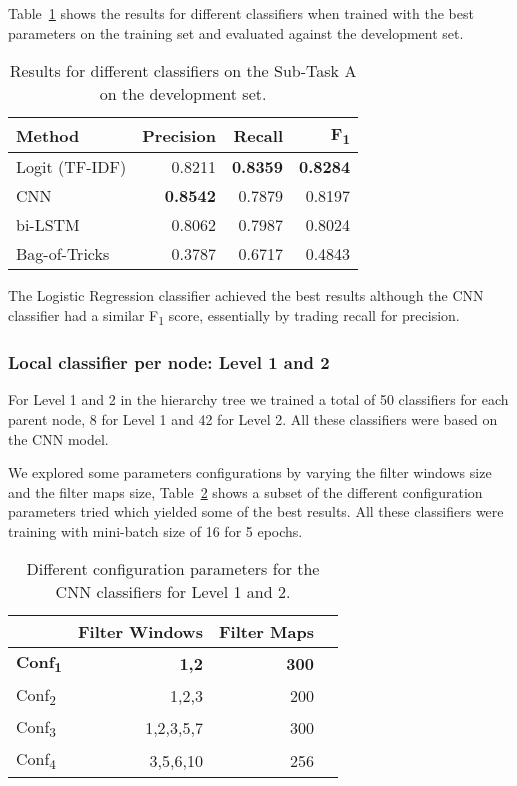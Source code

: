 \documentclass[11pt,a4paper]{article}
\begin{document}
Table~\ref{subtask_a_devset-results} shows the results for different classifiers
when trained with the best parameters on the training set and evaluated against
the development set.

\begin{table}[!h]
\begin{center}
\begin{tabular}{|l|r|r|r|}
\hline\centering\textbf{Method}  & \textbf{Precision} &  \textbf{Recall} &  \textbf{F\textsubscript{1}}\\
\hline
 Logit (TF-IDF) & 0.8211 & \textbf{0.8359} & \textbf{0.8284} \\
 CNN            & \textbf{0.8542} & 0.7879 & 0.8197 \\
 bi-LSTM        & 0.8062 & 0.7987 & 0.8024 \\
 Bag-of-Tricks  & 0.3787 & 0.6717 & 0.4843 \\
\hline
\end{tabular}
\end{center}
\caption{\label{subtask_a_devset-results} Results for different classifiers on
         the Sub-Task A on the development set.}
\end{table}

The Logistic Regression classifier achieved the best results
although the CNN classifier had a similar F\textsubscript{1} score, essentially
by trading recall for precision.


\subsubsection{Local classifier per node: Level 1 and 2}

For Level 1 and 2 in the hierarchy tree we trained a total of 50 classifiers
for each parent node, 8 for Level 1 and 42 for Level 2. All these classifiers
were based on the CNN model.

We explored some parameters configurations by varying the filter windows size and
the filter maps size, Table~\ref{subtask_b_parameters_local} shows a subset of the different
configuration parameters tried which yielded some of the best results. All these
classifiers were training with mini-batch size of 16 for 5 epochs.

\begin{table}[!h]
\begin{center}
\begin{tabular}{|l|r|r|r|}
\hline\centering\textbf{}  & \textbf{Filter Windows} &  \textbf{Filter Maps} \\
\hline
\textbf{Conf\textsubscript{1}} & \textbf{1,2}       & \textbf{300} \\
Conf\textsubscript{2} & 1,2,3     & 200 \\
Conf\textsubscript{3} & 1,2,3,5,7 & 300 \\
Conf\textsubscript{4} & 3,5,6,10  & 256 \\
\hline
\end{tabular}
\end{center}
\caption{\label{subtask_b_parameters_local} Different configuration parameters
for the CNN classifiers for Level 1 and 2.}
\end{table}
\end{document}

